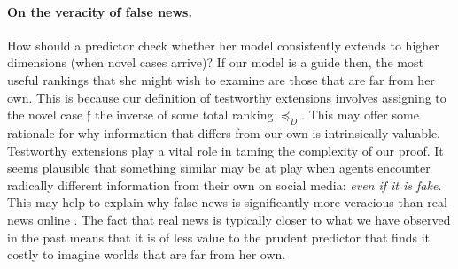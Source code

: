 \documentclass[12pt,a4paper,twoside]{article}
\newcommand{\novel}{\mathfrak f}
\newcommand{\preceqb}{\mathbin{\preceq}}
\newcommand{\mbbd}{{\mathds D}}
\newcommand{\current}{{C^\star}}
\newcommand{\fourdiv}{\textit{4}-\textup{diversity}}
\begin{document}




\paragraph{On the veracity of false news.} How should a predictor check whether
her model consistently extends to higher dimensions (when novel cases arrive)?
If our model is a guide then, the most useful rankings that she might wish to
examine are those that are far from her own. This is because our definition of
testworthy extensions involves assigning to the novel case $\novel$ the inverse
of some total ranking $\preceq_{D}$.  This may offer some rationale for why
information that differs from our own is intrinsically valuable. Testworthy
extensions play a vital role in taming the complexity of our proof. It seems
plausible that something similar may be at play when agents encounter radically
different information from their own on social media: \emph{even if it is
  fake}. This may help to explain why false news is significantly more veracious
than real news online \citep{Vosoughi-Roy-Aral-Veracity}. The fact that real
news is typically closer to what we have observed in the past means that it is
of less value to the prudent predictor that finds it costly to imagine worlds
that are far from her own.
\end{document}
